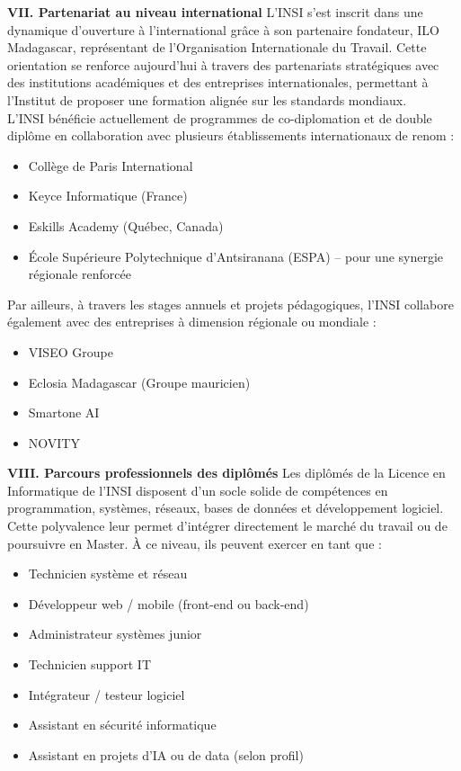 \documentclass[a4paper,12pt]{article}
\begin{document}
\textbf{VII. Partenariat au niveau international} 
L’INSI s’est inscrit dans une dynamique d’ouverture à l’international grâce à son partenaire fondateur, ILO Madagascar, représentant de l’Organisation Internationale du Travail. Cette orientation se renforce aujourd’hui à travers des partenariats stratégiques avec des institutions académiques et des entreprises internationales, permettant à l’Institut de proposer une formation alignée sur les standards mondiaux.\\

L’INSI bénéficie actuellement de programmes de co-diplomation et de double diplôme en collaboration avec plusieurs établissements internationaux de renom :
\begin{itemize}
    \item Collège de Paris International
    \item Keyce Informatique (France)
    \item Eskills Academy (Québec, Canada)
    \item École Supérieure Polytechnique d’Antsiranana (ESPA) – pour une synergie régionale renforcée
\end{itemize}

Par ailleurs, à travers les stages annuels et projets pédagogiques, l’INSI collabore également avec des entreprises à dimension régionale ou mondiale :
\begin{itemize}
    \item VISEO Groupe
    \item Eclosia Madagascar (Groupe mauricien)
    \item Smartone AI
    \item NOVITY
\end{itemize}

\textbf{VIII. Parcours professionnels des diplômés} 
Les diplômés de la Licence en Informatique de l’INSI disposent d’un socle solide de compétences en programmation, systèmes, réseaux, bases de données et développement logiciel. Cette polyvalence leur permet d’intégrer directement le marché du travail ou de poursuivre en Master. À ce niveau, ils peuvent exercer en tant que :
\begin{itemize}
    \item Technicien système et réseau
    \item Développeur web / mobile (front-end ou back-end)
    \item Administrateur systèmes junior
    \item Technicien support IT
    \item Intégrateur / testeur logiciel
    \item Assistant en sécurité informatique
    \item Assistant en projets d’IA ou de data (selon profil)
\end{itemize}
\end{document}
